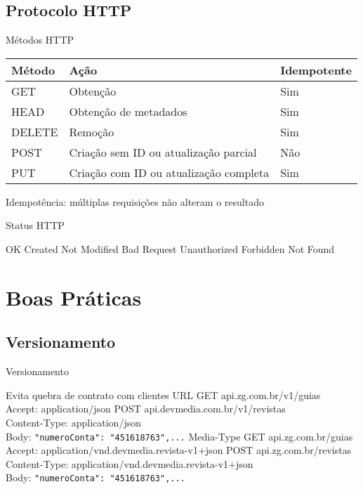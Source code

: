 \documentclass{beamer}
\begin{document}
\subsection{Protocolo HTTP}

\begin{frame}{Métodos HTTP}
  \begin{table}[]
  \begin{tabular}{@{}lll@{}}
  \toprule
  Método & Ação                                   & Idempotente \\ \midrule
  GET    & Obtenção                               & Sim         \\ \pause
  HEAD   & Obtenção de metadados                  & Sim         \\ \pause
  DELETE & Remoção                                & Sim         \\ \pause
  POST   & Criação sem ID ou atualização parcial  & Não         \\ \pause
  PUT    & Criação com ID ou atualização completa & Sim         \\ \bottomrule
  \end{tabular}
  \end{table}
  {\tiny Idempotência: múltiplas requisições não alteram o resultado}
\end{frame}

\begin{frame}{Status HTTP}
  \begin{outline}
     OK
     Created
     Not Modified
     Bad Request
     Unauthorized
     Forbidden
     Not Found
  \end{outline}
\end{frame}

\section{Boas Práticas}

\subsection{Versionamento}

\begin{frame}{Versionamento}
  \begin{outline}
  \0 Evita quebra de contrato com clientes
     URL
       GET api.zg.com.br/\alert{v1}/guias\\Accept: application/json
       POST api.devmedia.com.br/\alert{v1}/revistas\\Content-Type: application/json\\Body: \texttt{{"numeroConta": "451618763",...}}
     Media-Type
       GET api.zg.com.br/guias\\Accept: application/\alert{vnd.devmedia.revista-v1}+json
       POST api.zg.com.br/revistas\\Content-Type: application/\alert{vnd.devmedia.revista-v1}+json\\Body: \texttt{{"numeroConta": "451618763",...}}
  \end{outline}
\end{frame}
\end{document}
